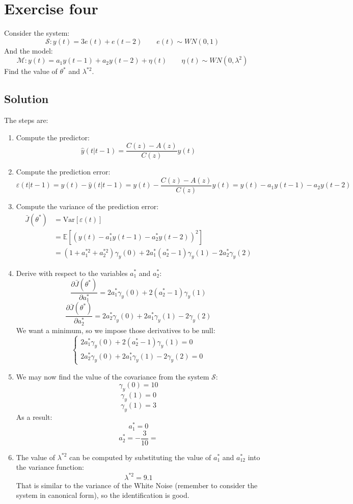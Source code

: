 \section{Exercise four}

Consider the system: 
\[\mathcal{S}:y(t)=3e(t)+e(t-2)\qquad e(t)\sim WN(0,1)\]
And the model: 
\[\mathcal{M}:y(t)=a_1y(t-1)+a_2y(t-2)+\eta(t) \qquad \eta(t)\sim WN(0,\lambda^2)\]
Find the value of $\theta^\ast$ and $\lambda^{\ast 2}$. 

\subsection*{Solution}
The steps are: 
\begin{enumerate}
    \item Compute the predictor: 
        \[\hat{y}(t|t-1)=\dfrac{C(z)-A(z)}{C(z)}y(t)\]
    \item Compute the prediction error: 
        \[\varepsilon(t|t-1)=y(t)-\hat{y}(t|t-1)=y(t)-\dfrac{C(z)-A(z)}{C(z)}y(t)=y(t)-a_1y(t-1)-a_2y(t-2)\]
    \item Compute the variance of the prediction error: 
        \begin{align*}
            \bar{J}(\theta^\ast)    &=\text{Var}\left[\varepsilon(t)\right]\\   
                                    &=\mathbb{E}\left[ \left(y(t)-a_1^\ast y(t-1)-a_2^\ast y(t-2)\right)^2 \right] \\
                                    &=\left(1+a_1^{ \ast 2}+a_2^{\ast 2}\right)\gamma_y(0)+2a_1^\ast\left(a_2^\ast-1\right)\gamma_y(1)-2a_2^\ast\gamma_y(2)
        \end{align*}
    \item Derive with respect to the variables $a_1^\ast$ and $a_2^\ast$: 
        \[\dfrac{\partial\bar{J}(\theta^\ast)}{\partial a_1^\ast}=2a_1^\ast\gamma_y(0)+2(a_2^\ast-1)\gamma_y(1)\]
        \[\dfrac{\partial\bar{J}(\theta^\ast)}{\partial a_2^\ast}=2a_2^\ast\gamma_y(0)+2a_1^\ast\gamma_y(1)-2\gamma_y(2)\]
        We want a minimum, so we impose those derivatives to be null: 
        \[\begin{cases}
            2a_1^\ast\gamma_y(0)+2(a_2^\ast-1)\gamma_y(1)=0  \\
            2a_2^\ast\gamma_y(0)+2a_1^\ast\gamma_y(1)-2\gamma_y(2)=0
        \end{cases}\]
    \item We may now find the value of the covariance from the system $\mathcal{S}$: 
        \[\gamma_y(0)=10\]
        \[\gamma_y(1)=0\]
        \[\gamma_y(1)=3\]
        As a result: 
        \[a_1^\ast=0\]
        \[a_2^\ast=-\dfrac{3}{10}=\]
    \item The value of $\lambda^{\ast 2}$ can be computed by substituting the value of $a_1^\ast$ and $a_12^\ast$ into the variance function: 
        \[\lambda^{\ast 2}=9.1\]
        That is similar to the variance of the White Noise (remember to consider the system in canonical form), so the identification is good. 
\end{enumerate}